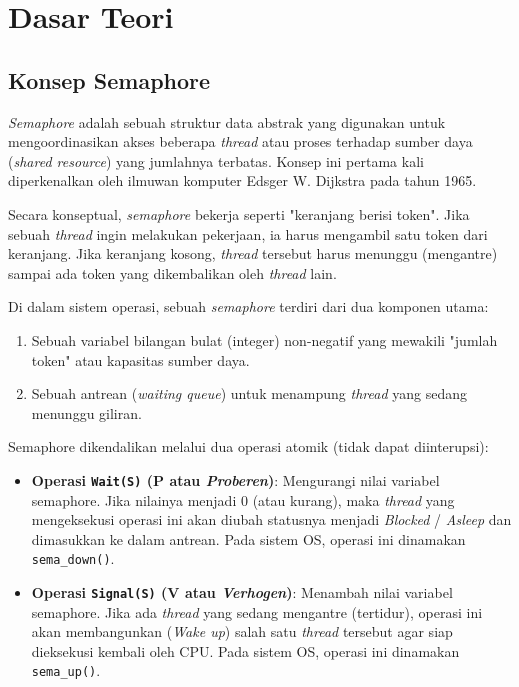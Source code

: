 \newpage
\section{Dasar Teori}

\subsection{Konsep Semaphore}

\textit{Semaphore} adalah sebuah struktur data abstrak yang digunakan untuk mengoordinasikan akses beberapa \textit{thread} atau proses terhadap sumber daya (\textit{shared resource}) yang jumlahnya terbatas.
Konsep ini pertama kali diperkenalkan oleh ilmuwan komputer Edsger W. Dijkstra pada tahun 1965.

Secara konseptual, \textit{semaphore} bekerja seperti "keranjang berisi token". Jika sebuah \textit{thread} ingin melakukan pekerjaan, ia harus mengambil satu token dari keranjang. Jika keranjang kosong,
\textit{thread} tersebut harus menunggu (mengantre) sampai ada token yang dikembalikan oleh \textit{thread} lain.

Di dalam sistem operasi, sebuah \textit{semaphore} terdiri dari dua komponen utama:
\begin{enumerate}
	\item Sebuah variabel bilangan bulat (integer) non-negatif yang mewakili "jumlah token" atau kapasitas sumber daya.
	\item Sebuah antrean (\textit{waiting queue}) untuk menampung \textit{thread} yang sedang menunggu giliran.
\end{enumerate}

Semaphore dikendalikan melalui dua operasi atomik (tidak dapat diinterupsi):
\begin{itemize}
	\item \textbf{Operasi \texttt{Wait(S)} (P atau \textit{Proberen})}: Mengurangi nilai variabel semaphore. Jika nilainya menjadi $0$ (atau kurang), maka \textit{thread} yang mengeksekusi operasi ini akan diubah
	      statusnya menjadi \textit{Blocked} / \textit{Asleep} dan dimasukkan ke dalam antrean. Pada sistem OS, operasi ini dinamakan \texttt{sema\_down()}.
	\item \textbf{Operasi \texttt{Signal(S)} (V atau \textit{Verhogen})}: Menambah nilai variabel semaphore. Jika ada \textit{thread} yang sedang mengantre (tertidur), operasi ini akan membangunkan (\textit{Wake up})
	      salah satu \textit{thread} tersebut agar siap dieksekusi kembali oleh CPU. Pada sistem OS, operasi ini dinamakan \texttt{sema\_up()}.
\end{itemize}


